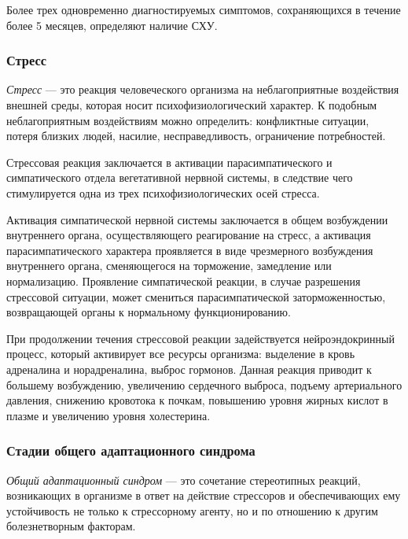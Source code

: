Более трех одновременно диагностируемых симптомов, сохраняющихся в течение более 5 месяцев, определяют наличие СХУ. \cite{syndromOfChrono}


\subsubsection{Стресс}
\textit{Стресс} --- это реакция человеческого организма на неблагоприятные воздействия внешней среды, которая носит психофизиологический характер. К подобным неблагоприятным воздействиям можно определить: конфликтные ситуации, потеря близких людей, насилие, несправедливость, ограничение потребностей. \cite{neuroPhysicalMechasmsOfStress}

Стрессовая реакция заключается в активации парасимпатического и симпатического отдела вегетативной нервной системы, в следствие чего стимулируется одна из трех психофизиологических осей стресса. \cite{neuroPhysicalMechasmsOfStress}

Активация симпатической нервной системы заключается в общем возбуждении внутреннего органа, осуществляющего реагирование на стресс, а активация парасимпатического характера проявляется в виде чрезмерного возбуждения внутреннего органа, сменяющегося на торможение, замедление или нормализацию. Проявление симпатической реакции, в случае разрешения стрессовой ситуации, может смениться парасимпатической заторможенностью, возвращающей органы к нормальному функционированию. \cite{neuroPhysicalMechasmsOfStress}

При продолжении течения стрессовой реакции задействуется нейроэндокринный процесс, который активирует все ресурсы организма: выделение в кровь адреналина и норадреналина, выброс гормонов. Данная реакция приводит к большему возбуждению, увеличению сердечного выброса, подъему артериального давления, снижению кровотока к почкам, повышению уровня жирных кислот в плазме и увеличению уровня холестерина. \cite{neuroPhysicalMechasmsOfStress}

\subsubsection{Стадии общего адаптационного синдрома}

\textit{Общий адаптационный синдром} --- это сочетание стереотипных реакций, возникающих в организме в ответ на действие стрессоров и обеспечивающих ему устойчивость не только к стрессорному агенту, но и по отношению к другим болезнетворным факторам. \cite{stressAndPatology}

